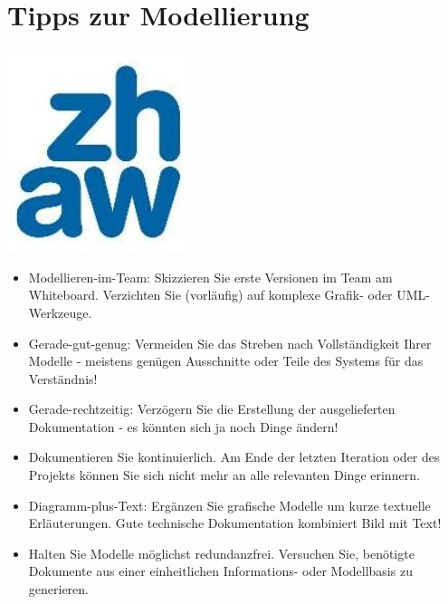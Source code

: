 \documentclass[10pt]{article}
\begin{document}
\section*{Tipps zur Modellierung}
\begin{center}
\includegraphics[max width=\textwidth]{2025_01_02_787afb9584031d2940deg-20}
\end{center}

\begin{itemize}
  \item Modellieren-im-Team: Skizzieren Sie erste Versionen im Team am Whiteboard. Verzichten Sie (vorläufig) auf komplexe Grafik- oder UML-Werkzeuge.
  \item Gerade-gut-genug: Vermeiden Sie das Streben nach Vollständigkeit Ihrer Modelle - meistens genügen Ausschnitte oder Teile des Systems für das Verständnis!
  \item Gerade-rechtzeitig: Verzögern Sie die Erstellung der ausgelieferten Dokumentation - es könnten sich ja noch Dinge ändern!
  \item Dokumentieren Sie kontinuierlich. Am Ende der letzten Iteration oder des Projekts können Sie sich nicht mehr an alle relevanten Dinge erinnern.
  \item Diagramm-plus-Text: Ergänzen Sie grafische Modelle um kurze textuelle Erläuterungen. Gute technische Dokumentation kombiniert Bild mit Text!
  \item Halten Sie Modelle möglichst redundanzfrei. Versuchen Sie, benötigte Dokumente aus einer einheitlichen Informations- oder Modellbasis zu generieren.
\end{itemize}
\end{document}
